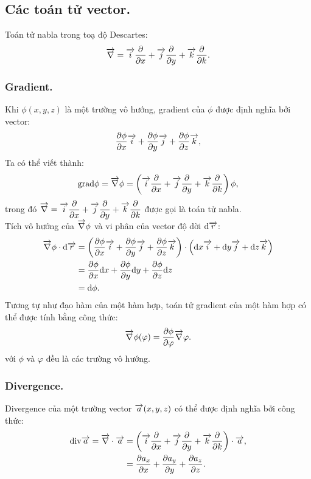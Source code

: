 \begin{appendices}
\subsection{Các toán tử vector.}
Toán tử nabla trong toạ độ Descartes:
$$\overrightarrow{\nabla}=\overrightarrow{i}\dfrac{\partial}{\partial x}+\overrightarrow{j}\dfrac{\partial}{\partial y}+\overrightarrow{k}\dfrac{\partial}{\partial k}.$$
\subsubsection{Gradient.}
Khi $\phi(x,y,z)$ là một trường vô hướng, gradient của $\phi$ được định nghĩa bởi vector:
$$\dfrac{\partial \phi}{\partial x}\overrightarrow{i}+\dfrac{\partial \phi}{\partial y}\overrightarrow{j}+\dfrac{\partial \phi}{\partial z}\overrightarrow{k},$$
Ta có thể viết thành:
$$\mathrm{grad}\phi=\overrightarrow{\nabla} \phi=\left(\overrightarrow{i}\dfrac{\partial}{\partial x}+\overrightarrow{j}\dfrac{\partial}{\partial y}+\overrightarrow{k}\dfrac{\partial}{\partial k}\right)\phi,$$
trong đó $\overrightarrow{\nabla}=\overrightarrow{i}\dfrac{\partial}{\partial x}+\overrightarrow{j}\dfrac{\partial}{\partial y}+\overrightarrow{k}\dfrac{\partial}{\partial k}$ được gọi là toán tử nabla.\\
Tích vô hướng của $\overrightarrow{\nabla}\phi$ và vi phân của vector độ dời $\mathrm{d} \overrightarrow{r}$:
\begin{align*}
    \overrightarrow{\nabla}\phi\cdot\mathrm{d} \overrightarrow{r}&=\left(\dfrac{\partial \phi}{\partial x}\overrightarrow{i}+\dfrac{\partial \phi}{\partial y}\overrightarrow{j}+\dfrac{\partial \phi}{\partial z}\overrightarrow{k}\right)\cdot\left(\mathrm{d} x\overrightarrow{i}+\mathrm{d} y\overrightarrow{j}+\mathrm{d} z\overrightarrow{k}\right)\\
    &=\dfrac{\partial \phi}{\partial x}\mathrm{d} x+\dfrac{\partial \phi}{\partial y}\mathrm{d} y+\dfrac{\partial \phi}{\partial z}\mathrm{d} z\\
    &=\mathrm{d} \phi.
\end{align*}
Tương tự như đạo hàm của một hàm hợp, toán tử gradient của một hàm hợp có thể được tính bằng công thức:
$$\overrightarrow{\nabla}\phi(\varphi)=\dfrac{\partial \phi}{\partial \varphi}\overrightarrow{\nabla}\varphi.$$
với $\phi$ và $\varphi$ đều là các trường vô hướng.
\subsubsection{Divergence.}
Divergence của một trường vector $\overrightarrow{a}(x,y,z)$ có thể được định nghĩa bởi công thức:
\begin{align*}
\mathrm{div} \overrightarrow{a}=\overrightarrow{\nabla}\cdot \overrightarrow{a}
&=\left(\overrightarrow{i}\dfrac{\partial}{\partial x}+\overrightarrow{j}\dfrac{\partial}{\partial y}+\overrightarrow{k}\dfrac{\partial}{\partial k}\right)\cdot \overrightarrow{a},\\
&=\dfrac{\partial a_x }{\partial x}+\dfrac{\partial a_y }{\partial y}+\dfrac{\partial a_z}{\partial z}.\\
\end{align*}

\end{appendices}
